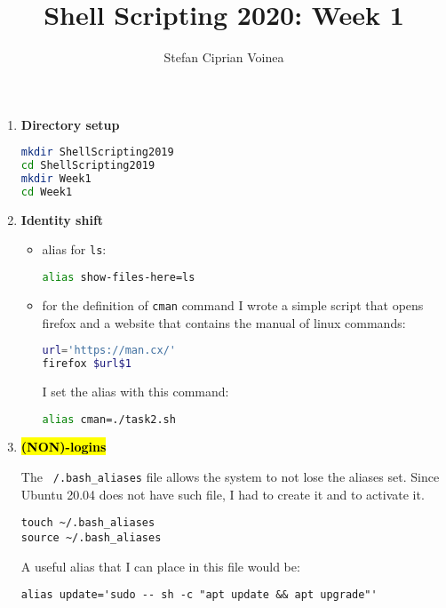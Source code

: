 \documentclass[9pt]{article}
\begin{document}
\title{Shell Scripting 2020: Week 1}
\author{Stefan Ciprian Voinea}
\maketitle


\begin{enumerate}
	\item \textbf{Directory setup}
		\begin{lstlisting}[language=bash]
mkdir ShellScripting2019
cd ShellScripting2019
mkdir Week1
cd Week1
		\end{lstlisting}

	\item \textbf{Identity shift}
		\begin{itemize}
			\item alias for \texttt{ls}:
			\begin{lstlisting}[language=bash]
alias show-files-here=ls
			\end{lstlisting}
			\item for the definition of \texttt{cman} command I wrote a simple script that opens firefox and a website that contains the manual of linux commands:
			\begin{lstlisting}[language=bash]
url='https://man.cx/'
firefox $url$1 
			\end{lstlisting}
			I set the alias with this command:
			\begin{lstlisting}[language=bash]
alias cman=./task2.sh
			\end{lstlisting}
		\end{itemize}

	\item \hl{\textbf{(NON)-logins}}
	
		The \texttt{~/.bash\_aliases} file allows the system to not lose the aliases set.
		Since Ubuntu 20.04 does not have such file, I had to create it and to activate it.
		\begin{lstlisting}
touch ~/.bash_aliases
source ~/.bash_aliases
		\end{lstlisting}
		A useful alias that I can place in this file would be:
		\begin{lstlisting}
alias update='sudo -- sh -c "apt update && apt upgrade"'
		\end{lstlisting}


\end{enumerate}
\end{document}
